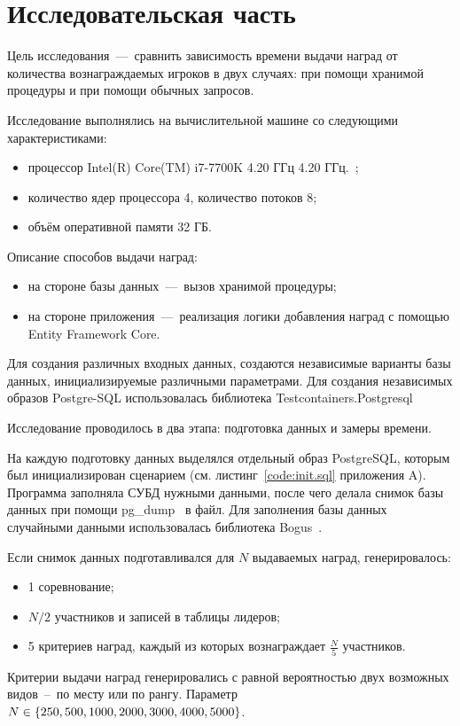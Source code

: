 \chapter{Исследовательская часть}
Цель исследования~---~сравнить зависимость времени выдачи наград от количества вознаграждаемых игроков в двух случаях: при помощи хранимой процедуры и при помощи обычных запросов.

Исследование выполнялись на вычислительной машине со следующими характеристиками:
\begin{itemize}
	\item процессор Intel(R) Core(TM) i7-7700K 4.20 ГГц 4.20 ГГц.~\cite{intel};
	\item количество ядер процессора 4, количество потоков 8;
	\item объём оперативной памяти 32 ГБ.
\end{itemize}

Описание способов выдачи наград:
\begin{itemize}
	\item на стороне базы данных~---~вызов хранимой процедуры;
	\item на стороне приложения~---~реализация логики добавления наград с помощью Entity Framework Core.
\end{itemize}

Для создания различных входных данных, создаются независимые варианты базы данных, инициализируемые различными параметрами. Для создания независимых образов Postgre-SQL использовалась библиотека Testcontainers.Postgresql~\cite{testcontainers}

Исследование проводилось в два этапа: подготовка данных и замеры времени.

На каждую подготовку данных выделялся отдельный образ PostgreSQL, которым был инициализирован сценарием (см. листинг~\ref{code:init.sql} приложения A). Программа заполняла СУБД нужными данными, после чего делала снимок базы данных при помощи pg\_dump~\cite{postgresql_pgdump} в файл. Для заполнения базы данных случайными данными использовалась библиотека Bogus~\cite{bogus}.

Если снимок данных подготавливался для $N$ выдаваемых наград, генерировалось:
\begin{itemize}
	\item 1 соревнование;
	\item $N/2$ участников и записей в таблицы лидеров;
	\item 5 критериев наград, каждый из которых вознаграждает $\frac{N}{5}$ участников.
\end{itemize}
Критерии выдачи наград генерировались с равной вероятностью двух возможных видов~--~по месту или по рангу. Параметр $N \in \{250, 500, 1000, 2000,\\ 3000, 4000, 5000\}$.

